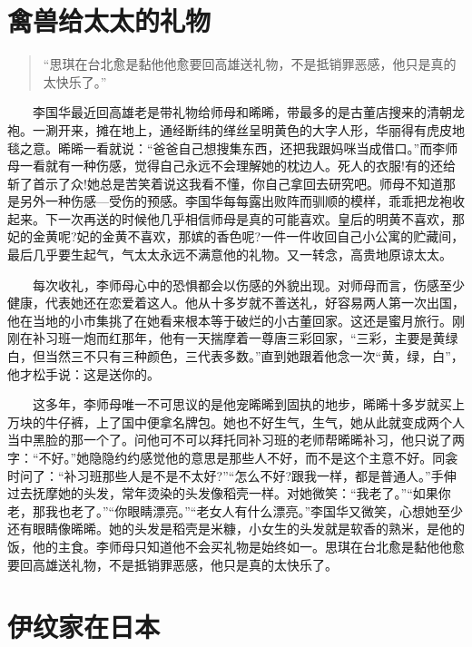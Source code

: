 \documentclass[12pt,UTF8]{ctexbook}
\begin{document}
\hypertarget{ux79bdux517dux7ed9ux592aux592aux7684ux793cux7269}{%
\section*{禽兽给太太的礼物}\label{ux79bdux517dux7ed9ux592aux592aux7684ux793cux7269}}

\begin{quote}
\enquote{思琪在台北愈是黏他他愈要回高雄送礼物，不是抵销罪恶感，他只是真的太快乐了。}
\end{quote}

　　李国华最近回高雄老是带礼物给师母和晞晞，带最多的是古董店搜来的清朝龙袍。一涮开来，摊在地上，通经断纬的缂丝呈明黄色的大字人形，华丽得有虎皮地毯之意。晞晞一看就说：\enquote{爸爸自己想搜集东西，还把我跟妈咪当成借口。}而李师母一看就有一种伤感，觉得自己永远不会理解她的枕边人。死人的衣服!有的还给斩了首示了众!她总是苦笑着说这我看不懂，你自己拿回去研究吧。师母不知道那是另外一种伤感---受伤的预感。李国华每每露出败阵而驯顺的模样，乖乖把龙袍收起来。下一次再送的时候他几乎相信师母是真的可能喜欢。皇后的明黄不喜欢，那妃的金黄呢?妃的金黄不喜欢，那嫔的香色呢?一件一件收回自己小公寓的贮藏间，最后几乎要生起气，气太太永远不满意他的礼物。又一转念，高贵地原谅太太。

　　每次收礼，李师母心中的恐惧都会以伤感的外貌出现。对师母而言，伤感至少健康，代表她还在恋爱着这人。他从十多岁就不善送礼，好容易两人第一次出国，他在当地的小市集挑了在她看来根本等于破烂的小古董回家。这还是蜜月旅行。刚刚在补习班一炮而红那年，他有一天揣摩着一尊唐三彩回家，\enquote{三彩，主要是黄绿白，但当然三不只有三种颜色，三代表多数。}直到她跟着他念一次\enquote{黄，绿，白}，他才松手说：这是送你的。

　　这多年，李师母唯一不可思议的是他宠晞晞到固执的地步，晞晞十多岁就买上万块的牛仔裤，上了国中便拿名牌包。她也不好生气，生气，她从此就变成两个人当中黑脸的那一个了。问他可不可以拜托同补习班的老师帮晞晞补习，他只说了两字：\enquote{不好。}她隐隐约约感觉他的意思是那些人不好，而不是这个主意不好。同衾时问了：\enquote{补习班那些人是不是不太好?}\enquote{怎么不好?跟我一样，都是普通人。}手伸过去抚摩她的头发，常年烫染的头发像稻壳一样。对她微笑：\enquote{我老了。}\enquote{如果你老，那我也老了。}\enquote{你眼睛漂亮。}\enquote{老女人有什么漂亮。}李国华又微笑，心想她至少还有眼睛像晞晞。她的头发是稻壳是米糠，小女生的头发就是软香的熟米，是他的饭，他的主食。李师母只知道他不会买礼物是始终如一。思琪在台北愈是黏他他愈要回高雄送礼物，不是抵销罪恶感，他只是真的太快乐了。

\hypertarget{ux4f0aux7eb9ux5bb6ux5728ux65e5ux672c}{%
\section*{伊纹家在日本}\label{ux4f0aux7eb9ux5bb6ux5728ux65e5ux672c}}
\end{document}
